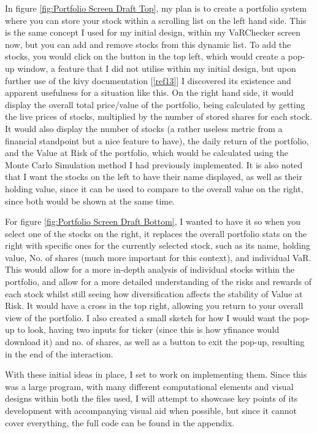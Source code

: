 \documentclass{article}
\begin{document}
In figure \ref{fig:Portfolio Screen Draft Top}, my plan is to create a portfolio system where you can store your stock within a scrolling list on the left hand side. This is the same concept I used for my initial design, within my VaRChecker screen now, but you can add and remove stocks from this dynamic list. To add the stocks, you would click on the button in the top left, which would create a pop-up window, a feature that I did not utilise within my initial design, but upon further use of the kivy documentation [\ref{ref13}] I discovered its existence and apparent usefulness for a situation like this. On the right hand side, it would display the overall total price/value of the portfolio, being calculated by getting the live prices of stocks, multiplied by the number of stored shares for each stock. It would also display the number of stocks (a rather useless metric from a financial standpoint but a nice feature to have), the daily return of the portfolio, and the Value at Risk of the portfolio, which would be calculated using the Monte Carlo Simulation method I had previously implemented. It is also noted that I want the stocks on the left to have their name displayed, as well as their holding value, since it can be used to compare to the overall value on the right, since both would be shown at the same time.\\\vspace{0.3cm}

For figure \ref{fig:Portfolio Screen Draft Bottom}, I wanted to have it so when you select one of the stocks on the right, it replaces the overall portfolio stats on the right with specific ones for the currently selected stock, such as its name, holding value, No. of shares (much more important for this context), and individual VaR. This would allow for a more in-depth analysis of individual stocks within the portfolio, and allow for a more detailed understanding of the risks and rewards of each stock whilst still seeing how diversification affects the stability of Value at Risk. It would have a cross in the top right, allowing you return to your overall view of the portfolio. I also created a small sketch for how I would want the pop-up to look, having two inputs for ticker (since this is how yfinance would download it) and no. of shares, as well as a button to exit the pop-up, resulting in the end of the interaction.\\\vspace{0.3cm}

With these initial ideas in place, I set to work on implementing them. Since this was a large program, with many different computational elements and visual designs within both the files used, I will attempt to showcase key points of its development with accompanying visual aid when possible, but since it cannot cover everything, the full code can be found in the appendix.\\\vspace{0.3cm}
\end{document}

